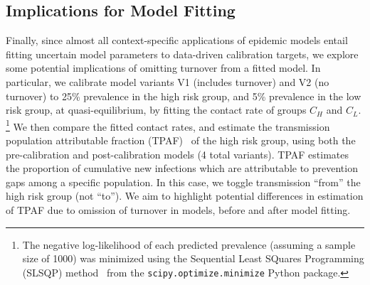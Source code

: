 \subsection{Implications for Model Fitting}\label{ss:exp-turnover-fit}
Finally, since almost all context-specific applications of epidemic models entail
fitting uncertain model parameters to data-driven calibration targets,
we explore some potential implications of omitting turnover from a fitted model.
In particular, we calibrate model variants V1 (includes turnover) and V2 (no turnover) to
25\% prevalence in the high risk group, and
5\% prevalence in the low risk group,
at quasi-equilibrium, by fitting the contact rate of groups $C_H$ and $C_L$.%
\footnote{The negative log-likelihood of each predicted prevalence
  (assuming a sample size of 1000)
  was minimized using the Sequential Least SQuares Programming (SLSQP) method~\citep{Kraft1988}
  from the \texttt{scipy.optimize.minimize} Python package.}
We then compare the fitted contact rates,
and estimate the transmission population attributable fraction (TPAF)~\citep{Mishra2012}
of the high risk group,
using both the pre-calibration and post-calibration models (4 total variants).
TPAF estimates the proportion of cumulative new infections which are attributable to
prevention gaps among a specific population.
In this case, we toggle transmission ``from'' the high risk group (not ``to'').
We aim to highlight potential differences in estimation of TPAF
due to omission of turnover in models, before and after model fitting.
